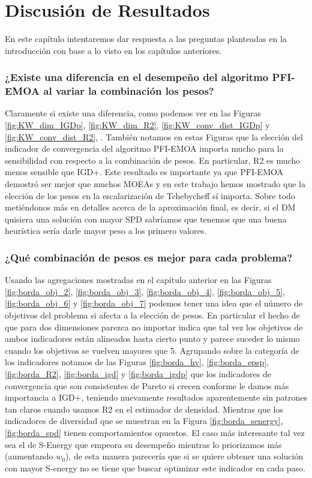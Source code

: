 \chapter{Discusión de Resultados}

En este capítulo intentaremos dar respuesta a las preguntas planteadas en la introducción con base a lo visto en los capítulos anteriores.

\subsection*{¿Existe una diferencia en el desempeño del algoritmo PFI-EMOA al variar la combinación los pesos?}

Claramente si existe una diferencia, como podemos ver en las Figuras \ref{fig:KW_dim_IGDp}, \ref{fig:KW_dim_R2}, \ref{fig:KW_conv_dist_IGDp} y \ref{fig:KW_conv_dist_R2}, . También notamos en estas Figuras que la elección del indicador de convergencia del algoritmo PFI-EMOA importa mucho para la sensibilidad con respecto a la combinación de pesos. En particular, R2 es mucho menos sensible que IGD+. Este resultado es importante ya que PFI-EMOA demostró ser mejor que muchos MOEAs  y en este trabajo hemos mostrado que la elección de los pesos en la escalarización de Tchebycheff sí importa. Sobre todo metiéndonos más en detalles acerca de la aproximación final, es decir, si el DM quisiera una solución con mayor SPD sabríamos que tenemos que una buena heurística sería darle mayor peso a los primero valores. 

\subsection*{¿Qué combinación de pesos es mejor para cada problema?}

Usando las agregaciones mostradas en el capítulo anterior en las Figuras \ref{fig:borda_obj_2}, \ref{fig:borda_obj_3}, \ref{fig:borda_obj_4}, \ref{fig:borda_obj_5}, \ref{fig:borda_obj_6} y \ref{fig:borda_obj_7} podemos tener una idea que el número de objetivos del problema si afecta a la elección de pesos. En particular el hecho de que para dos dimensiones parezca no importar indica que tal vez los objetivos de ambos indicadores están alineados hasta cierto punto y parece suceder lo mismo cuando los objetivos se vuelven mayores que 5. Agrupando sobre la categoría de los indicadores notamos de las Figuras \ref{fig:borda_hv}, \ref{fig:borda_epsp}, \ref{fig:borda_R2}, \ref{fig:borda_igd} y \ref{fig:borda_igdp}  que los indicadores de convergencia que son consistentes de Pareto si crecen conforme le damos más importancia a IGD+, teniendo nuevamente resultados aparentemente sin patrones tan claros cuando usamos R2 en el estimador de densidad. Mientras que los indicadores de diversidad que se muestran en la Figura \ref{fig:borda_senergy}, \ref{fig:borda_spd} tienen comportamientos opuestos. El caso más interesante tal vez sea el de S-Energy que empeora su desempeño mientras lo priorizamos más (aumentando $w_0$), de esta manera parecería que si se quiere obtener una solución con mayor S-energy no se tiene que buscar optimizar este indicador en cada paso.   

